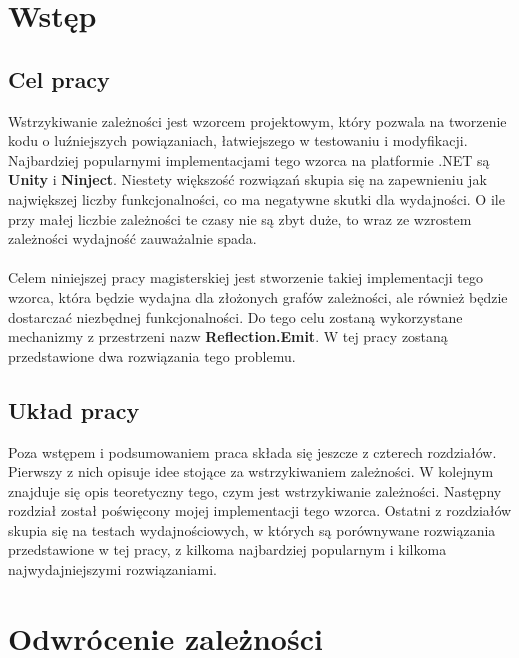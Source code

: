 \documentclass[12pt]{article}
\begin{document}
\clearpage
\tableofcontents


\clearpage
\section{Wstęp}
\subsection{Cel pracy}
Wstrzykiwanie zależności jest wzorcem projektowym, który pozwala na tworzenie kodu o luźniejszych powiązaniach, łatwiejszego w testowaniu i modyfikacji. Najbardziej popularnymi implementacjami tego wzorca na platformie .NET są \textbf{Unity} i \textbf{Ninject}. Niestety większość rozwiązań skupia się na zapewnieniu jak największej liczby funkcjonalności, co ma negatywne skutki dla wydajności. O ile przy małej liczbie zależności te czasy nie są zbyt duże, to wraz ze wzrostem zależności wydajność zauważalnie spada.\\
\\
Celem niniejszej pracy magisterskiej jest stworzenie takiej implementacji tego wzorca, która będzie wydajna dla złożonych grafów zależności, ale również będzie dostarczać niezbędnej funkcjonalności. Do tego celu zostaną wykorzystane mechanizmy z przestrzeni nazw \textbf{Reflection.Emit}. W tej pracy zostaną przedstawione dwa rozwiązania tego problemu.

\subsection{Układ pracy}
Poza wstępem i podsumowaniem praca składa się jeszcze z czterech rozdziałów. Pierwszy z nich opisuje idee stojące za wstrzykiwaniem zależności. W kolejnym znajduje się opis teoretyczny tego, czym jest wstrzykiwanie zależności. Następny rozdział został poświęcony mojej implementacji tego wzorca. Ostatni z rozdziałów skupia się na testach wydajnościowych, w których są porównywane rozwiązania przedstawione w tej pracy, z kilkoma najbardziej popularnym i kilkoma najwydajniejszymi rozwiązaniami.



\clearpage
\section{Odwrócenie zależności}
\end{document}
